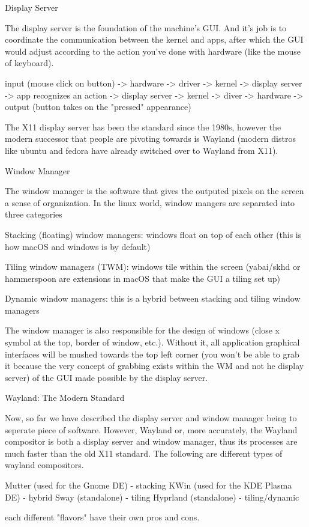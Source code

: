 \documentclass[10pt]{article}
\begin{document}
    \begin{core}{Display Server}

      The display server is the foundation of the machine's GUI. And it's job is to coordinate the communication between the kernel and apps, after which the GUI would adjust according to the action you've done with hardware (like the mouse of keyboard).

      input (mouse click on button) -> hardware -> driver -> kernel -> display server -> app recognizes an action -> display server -> kernel -> diver -> hardware -> output (button takes on the "pressed" appearance)

      The X11 display server has been the standard since the 1980s, however the modern successor that people are pivoting towards is Wayland (modern distros like ubuntu and fedora have already switched over to Wayland from X11).

    \end{core}

    \begin{core}{Window Manager}
   
      The window manager is the software that gives the outputed pixels on the screen a sense of organization. In the linux world, window mangers are separated into three categories

        Stacking (floating) window managers: windows float on top of each other (this is how macOS and windows is by default)

        Tiling window managers (TWM): windows tile within the screen (yabai/skhd or hammerspoon are extensions in macOS that make the GUI a tiling set up)
    
        Dynamic window managers: this is a hybrid between stacking and tiling window managers

      The window manager is also responsible for the design of windows (close x symbol at the top, border of window, etc.). Without it, all application graphical interfaces will be mushed towards the top left corner (you won't be able to grab it because the very concept of grabbing exists within the WM and not he display server) of the GUI made possible by the display server.

    \end{core}

    \begin{core}{Wayland: The Modern Standard}

      Now, so far we have described the display server and window manager being to seperate piece of software. However, Wayland or, more accurately, the Wayland compositor is both a display server and window manager, thus its processes are much faster than the old X11 standard. The following are different types of wayland compositors.

        Mutter (used for the Gnome DE) - stacking
        KWin (used for the KDE Plasma DE) - hybrid
        Sway (standalone) - tiling
        Hyprland (standalone) - tiling/dynamic

      each different "flavors" have their own pros and cons.

    \end{core}
\end{document}
